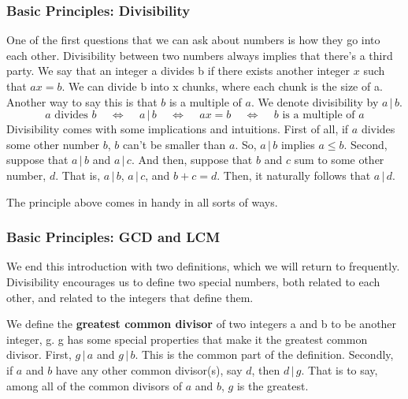 \documentclass{article}
\newcommand{\divv}{\,|\,}
\begin{document}
\subsubsection*{Basic Principles: Divisibility} 
One of the first questions that we can ask about numbers is how they go into each other. Divisibility between two numbers always implies that there’s a third party.
We say that an integer a divides b if there exists another integer \(x\) such that \(ax = b\). We can divide b into x chunks, where each chunk is the size of a. Another way to say this is that \(b\) is a multiple of \(a\). We denote divisibility by \(a\divv b\).
\[\boxed{\,a \text{ divides } b\,} \quad \Leftrightarrow \quad \boxed{\,a \,|\, b\,} \quad \Leftrightarrow \quad \boxed{\,ax = b\,} \quad \Leftrightarrow \quad \boxed{\,b \text{ is a multiple of } a\,}\] 
Divisibility comes with some implications and intuitions. 
First of all, if \(a\) divides some other number \(b\), \(b\) can't be smaller than \(a\). So, \(a\divv b\) implies  \(a \leq b\). 
Second, suppose that \(a\divv b\) and \(a\divv c\). And then, suppose that \(b\) and \(c\) sum to some other number, \(d\). 
That is, \(a\divv b\), \(a\divv c\), and \(b+c = d\). Then, it naturally follows that \(a\divv d\). 


The principle above comes in handy in all sorts of ways. 


\subsubsection*{Basic Principles: GCD and LCM} 

We end this introduction with two definitions, which we will return to frequently. Divisibility encourages us to define two special numbers, both related to each other, and related to the integers that define them. 

We define the \textbf{greatest common divisor} of two integers a and b to be another integer, g. g has some special properties that make it the greatest common divisor. First, \(g\divv a\) and \(g\divv b\). This is the common part of the definition. Secondly, if $a$ and $b$ have any other common divisor(s), say \(d\), then \(d\divv g\). That is to say, among all of the common divisors of \(a\) and \(b\), \(g\) is the greatest. 
\end{document}
